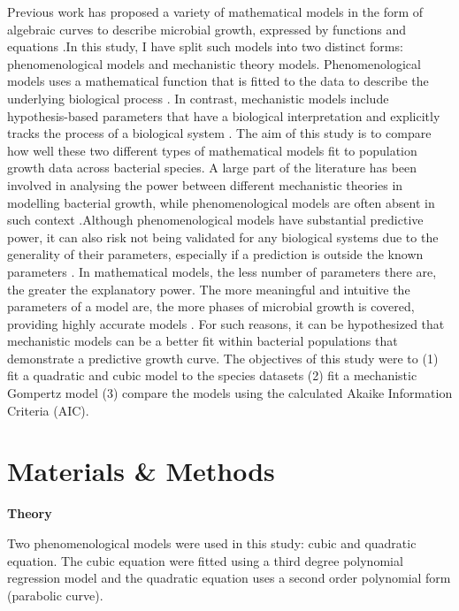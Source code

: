 \documentclass[11pt]{article}
\begin{document}
Previous work has proposed a variety of mathematical models in the form of algebraic curves to describe 
microbial growth, expressed by functions and equations \cite{soboleva_predictive_2000,peleg_microbial_2011}.In this study, I have split such 
models into two distinct forms: phenomenological models and mechanistic theory models. Phenomenological 
models uses a mathematical function that is fitted to the data to describe the underlying biological process \cite{white_should_2019}.
In contrast, mechanistic models include hypothesis-based parameters that have a biological interpretation 
and explicitly tracks the process of a biological system \cite{geritz_mathematical_2012}. The aim of this study is to compare how well 
these two different types of mathematical models fit to population growth data across bacterial species. A 
large part of the literature has been involved in analysing the power between different mechanistic theories 
in modelling bacterial growth, while phenomenological models are often absent in such context \cite{gibson_predicting_1988,adair_comparison_1989,labuza_growth_1993,mackey_effect_1988}.Although
phenomenological models have substantial predictive power, it can also risk not being validated for any
biological systems due to the generality of their parameters, especially if a prediction is outside the known 
parameters \cite{heitzer_utility_1991,schiraldi_phenomenological_nodate,geritz_mathematical_2012}. In mathematical models, the less number of parameters there are, the greater the explanatory
power. The more meaningful and intuitive the parameters of a model are, the more phases of microbial growth
is covered, providing highly accurate models \cite{esser_modeling_2015}. For such reasons, it can be hypothesized that mechanistic
models can be a better fit within bacterial populations that demonstrate a predictive growth 
curve. The objectives of this study were to (1) fit a quadratic and cubic model to the species datasets (2) 
fit a mechanistic Gompertz model (3) compare the models using the calculated Akaike Information Criteria 
(AIC). 

\section{Materials \& Methods}

\noindent\textbf{Theory}

Two phenomenological models were used in this study: cubic and quadratic equation. The cubic equation were
fitted using a third degree polynomial regression model and the quadratic equation uses a second order
polynomial form (parabolic curve).
\end{document}
